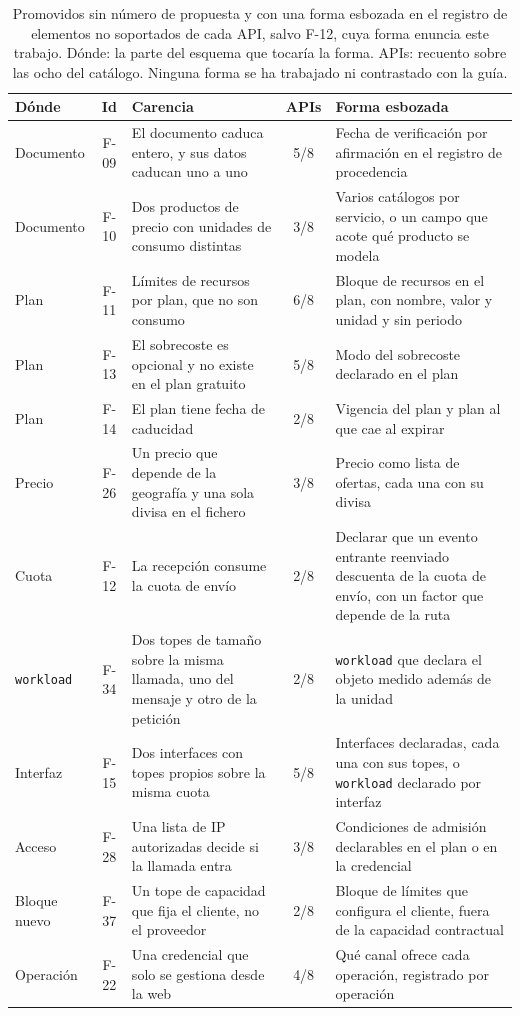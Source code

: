 \begin{table}[tbp]
\centering
\footnotesize
\setlength{\tabcolsep}{3pt}
\begin{tabular}{|l|c|>{\raggedright\arraybackslash}p{}|c|>{\raggedright\arraybackslash}p{}|}
\hline
\textbf{Dónde} & \textbf{Id} & \textbf{Carencia} & \textbf{APIs} & \textbf{Forma esbozada} \\
\hline
Documento & F-09 & El documento caduca entero, y sus datos caducan uno a uno & 5/8 & Fecha de verificación por afirmación en el registro de procedencia \\
\hline
Documento & F-10 & Dos productos de precio con unidades de consumo distintas & 3/8 & Varios catálogos por servicio, o un campo que acote qué producto se modela \\
\hline
Plan & F-11 & Límites de recursos por plan, que no son consumo & 6/8 & Bloque de recursos en el plan, con nombre, valor y unidad y sin periodo \\
\hline
Plan & F-13 & El sobrecoste es opcional y no existe en el plan gratuito & 5/8 & Modo del sobrecoste declarado en el plan \\
\hline
Plan & F-14 & El plan tiene fecha de caducidad & 2/8 & Vigencia del plan y plan al que cae al expirar \\
\hline
Precio & F-26 & Un precio que depende de la geografía y una sola divisa en el fichero & 3/8 & Precio como lista de ofertas, cada una con su divisa \\
\hline
Cuota & F-12 & La recepción consume la cuota de envío & 2/8 & Declarar que un evento entrante reenviado descuenta de la cuota de envío, con un factor que depende de la ruta \\
\hline
\texttt{workload} & F-34 & Dos topes de tamaño sobre la misma llamada, uno del mensaje y otro de la petición & 2/8 & \texttt{workload} que declara el objeto medido además de la unidad \\
\hline
Interfaz & F-15 & Dos interfaces con topes propios sobre la misma cuota & 5/8 & Interfaces declaradas, cada una con sus topes, o \texttt{workload} declarado por interfaz \\
\hline
Acceso & F-28 & Una lista de IP autorizadas decide si la llamada entra & 3/8 & Condiciones de admisión declarables en el plan o en la credencial \\
\hline
Bloque nuevo & F-37 & Un tope de capacidad que fija el cliente, no el proveedor & 2/8 & Bloque de límites que configura el cliente, fuera de la capacidad contractual \\
\hline
Operación & F-22 & Una credencial que solo se gestiona desde la web & 4/8 & Qué canal ofrece cada operación, registrado por operación \\
\hline
\end{tabular}
\caption[Promovidos sin número de propuesta y con una forma esbozada]{Promovidos sin número de propuesta y con una forma esbozada en el registro de elementos no soportados de cada API, salvo F-12, cuya forma enuncia este trabajo. Dónde: la parte del esquema que tocaría la forma. APIs: recuento sobre las ocho del catálogo. Ninguna forma se ha trabajado ni contrastado con la guía.}
\label{tab:sinforma}
\end{table}

